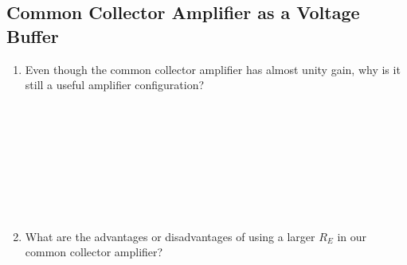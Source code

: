 \documentclass{article}
\begin{document}
\subsection{Common Collector Amplifier as a Voltage Buffer}
\begin{enumerate}
\item Even though the common collector amplifier has almost unity gain, why is it still a useful amplifier configuration?
\\~\\~\\~\\~\\~\\~\\~\\~\\
\item What are the advantages or disadvantages of using a larger $R_E$ in our common collector amplifier?
\\~\\~\\~\\~\\~\\~\\~\\~\\
\end{enumerate}
\end{document}
